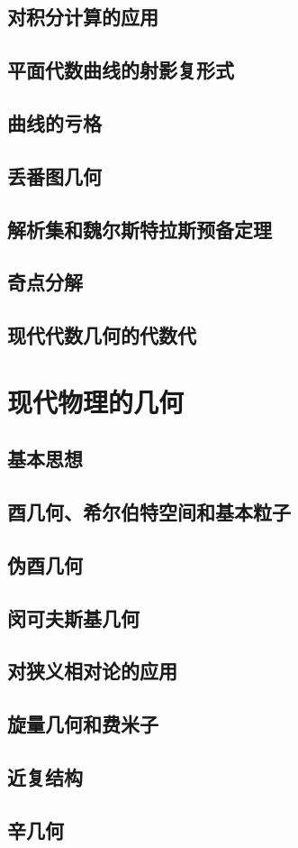 \section{对积分计算的应用}
\section{平面代数曲线的射影复形式}
\section{曲线的亏格}
\section{丢番图几何}
\section{解析集和魏尔斯特拉斯预备定理}
\section{奇点分解}
\section{现代代数几何的代数代}

\chapter{现代物理的几何}
\section{基本思想}
\section{酉几何、希尔伯特空间和基本粒子}
\section{伪酉几何}
\section{闵可夫斯基几何}
\section{对狭义相对论的应用}
\section{旋量几何和费米子}
\section{近复结构}
\section{辛几何}

